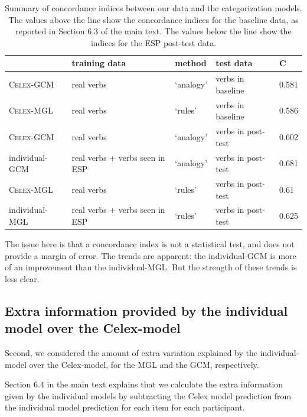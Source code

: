 \documentclass[12pt]{article}
\begin{document}
\begin{table}[h]

    \centering
    \begin{tabular}{lllll}
            & training data & method & test data & C\\
            \hline
\textsc{Celex}-GCM & real verbs & `analogy' & verbs in baseline &0.581\\
\textsc{Celex}-MGL & real verbs & `rules' & verbs in baseline &0.586\\ \hline
\textsc{Celex}-GCM & real verbs & `analogy' & verbs in post-test &0.602\\
individual-GCM & real verbs + verbs seen in ESP & `analogy' & verbs in post-test &0.681\\

\textsc{Celex}-MGL & real verbs & `rules' & verbs in post-test &0.61\\
individual-MGL & real verbs + verbs seen in ESP & `rules' & verbs in post-test &0.625\\
\hline
    \end{tabular}
    \caption{Summary of concordance indices between our data and the categorization models. The values above the line show the concordance indices for the baseline data, as reported in Section 6.3 of the main text. The values below the line show the indices for the ESP post-test data.}
    \label{modellingsummary}

\end{table}

The issue here is that a concordance index is not a statistical test, and does not provide a margin of error. The trends are apparent: the individual-GCM is more of an improvement than the individual-MGL. But the strength of these trends is less clear.

\subsection{Extra information provided by the individual model over the {\sc Celex}-model}

Second, we considered the amount of extra variation explained by the individual-model over the {\sc Celex}-model, for the MGL and the GCM, respectively.

Section 6.4 in the main text explains that we calculate the extra information given by the individual models by subtracting the {\sc Celex} model prediction from the individual model prediction for each item for each participant.
\end{document}

